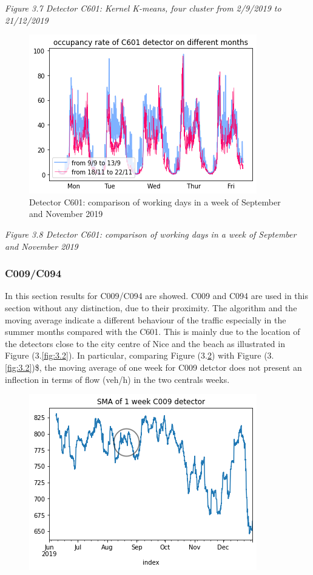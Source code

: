 \documentclass[11pt]{article}
\begin{document}
\emph{\small Figure 3.7 Detector C601: Kernel K-means, four cluster from 2/9/2019 to 21/12/2019}

    \begin{figure}
    \centering
    \includegraphics[scale=0.5]{C601 setember vs november 2019.png}
    \caption{Detector C601: comparison of working days in a week of September and November 2019}
    \label{fig:3.8}
\end{figure}

\emph{\small Figure 3.8 Detector C601: comparison of working days in a week of September and November 2019}

    \hypertarget{c009c094}{%
\subsubsection{C009/C094}\label{c009c094}}

    In this section results for C009/C094 are showed. C009 and C094 are used
in this section without any distinction, due to their proximity. The
algorithm and the moving average indicate a different behaviour of the
traffic especially in the summer months compared with the C601. This is
mainly due to the location of the detectors close to the city centre of
Nice and the beach as illustrated in Figure (3.\ref{fig:3.2}). In
particular, comparing Figure (3.\ref{fig:3.9}) with Figure
(3.\ref{fig:3.2})\$, the moving average of one week for C009 detctor
does not present an inflection in terms of flow (veh/h) in the two
centrals weeks.

    \begin{figure}
    \centering
    \includegraphics[scale=0.5]{SMA C009.png}
    \caption{}
    \label{fig:3.9}
\end{figure}
\end{document}
